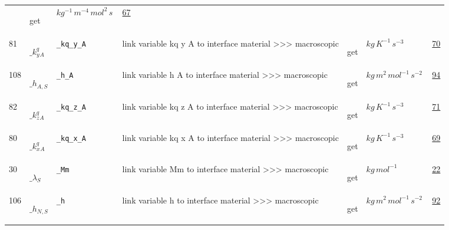 \begin{longtable}{|p{1cm}|p{2.5cm}|p{4.5cm}|p{8cm}|p{3.0cm}|p{3cm}|p{1cm}|}
             & \begin{lay}get \end{lay}
             & $ kg^{-1} \,m^{-4} \,mol^{2} \,s \, $
             &                 \hyperlink{"e:67"}{ 67 }
                 \\
            81
             & \hypertarget{"v:81"}{ $ {{\_k^q_y}}{_{A}} $}
             & \verb|_kq_y_A|
             & link variable kq y A to interface material >>> macroscopic
             & \begin{lay}get \end{lay}
             & $ kg \,K^{-1} \,s^{-3} \, $
             &                 \hyperlink{"e:70"}{ 70 }
                 \\
            108
             & \hypertarget{"v:108"}{ $ {{\_h}}{_{A, S}} $}
             & \verb|_h_A|
             & link variable h A to interface material >>> macroscopic
             & \begin{lay}get \end{lay}
             & $ kg \,m^{2} \,mol^{-1} \,s^{-2} \, $
             &                 \hyperlink{"e:94"}{ 94 }
                 \\
            82
             & \hypertarget{"v:82"}{ $ {{\_k^q_z}}{_{A}} $}
             & \verb|_kq_z_A|
             & link variable kq z A to interface material >>> macroscopic
             & \begin{lay}get \end{lay}
             & $ kg \,K^{-1} \,s^{-3} \, $
             &                 \hyperlink{"e:71"}{ 71 }
                 \\
            80
             & \hypertarget{"v:80"}{ $ {{\_k^q_x}}{_{A}} $}
             & \verb|_kq_x_A|
             & link variable kq x A to interface material >>> macroscopic
             & \begin{lay}get \end{lay}
             & $ kg \,K^{-1} \,s^{-3} \, $
             &                 \hyperlink{"e:69"}{ 69 }
                 \\
            30
             & \hypertarget{"v:30"}{ $ {{\_\lambda}}{_{S}} $}
             & \verb|_Mm|
             & link variable Mm to interface material >>> macroscopic
             & \begin{lay}get \end{lay}
             & $ kg \,mol^{-1} \, $
             &                 \hyperlink{"e:22"}{ 22 }
                 \\
            106
             & \hypertarget{"v:106"}{ $ {{\_h}}{_{N, S}} $}
             & \verb|_h|
             & link variable h to interface material >>> macroscopic
             & \begin{lay}get \end{lay}
             & $ kg \,m^{2} \,mol^{-1} \,s^{-2} \, $
             &                 \hyperlink{"e:92"}{ 92 }
                 \\
    \end{longtable}